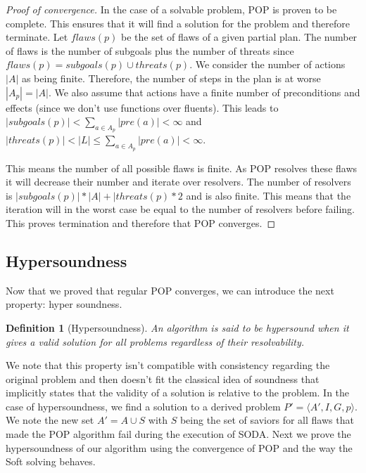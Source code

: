 \documentclass[]{article}
\newtheorem{definition}{Definition}
\begin{document}
\begin{proof}[Proof of convergence]

In the case of a solvable problem, POP is proven to be complete. This
ensures that it will find a solution for the problem and therefore
terminate. Let \(flaws(p)\) be the set of flaws of a given partial plan.
The number of flaws is the number of subgoals plus the number of threats
since \(flaws(p) = subgoals(p) \cup threats(p)\). We consider the number
of actions \(|A|\) as being finite. Therefore, the number of steps in
the plan is at worse \(|A_p| = |A|\). We also assume that actions have a
finite number of preconditions and effects (since we don't use functions
over fluents). This leads to
\(|subgoals(p)| < \sum_{a \in A_p} |pre(a)| < \infty\) and
\(|threats(p)| < |L| \le \sum_{a \in A_p} |pre(a)| < \infty\).

This means the number of all possible flaws is finite. As POP resolves
these flaws it will decrease their number and iterate over resolvers.
The number of resolvers is \(|subgoals(p)| * |A| + |threats(p) * 2\) and
is also finite. This means that the iteration will in the worst case be
equal to the number of resolvers before failing. This proves termination
and therefore that POP converges. \qedhere

\end{proof}

\subsection{Hypersoundness}\label{hypersoundeness}

Now that we proved that regular POP converges, we can introduce the next
property: hyper soundness.

\begin{definition}[Hypersoundness]

An algorithm is said to be hypersound when it gives a valid solution for
all problems regardless of their resolvability.

\end{definition}

We note that this property isn't compatible with consistency regarding
the original problem and then doesn't fit the classical idea of
soundness that implicitly states that the validity of a solution is
relative to the problem. In the case of hypersoundness, we find a
solution to a derived problem \(P' = \langle A', I, G, p\rangle\). We
note the new set \(A' = A \cup S\) with \(S\) being the set of saviors
for all flaws that made the POP algorithm fail during the execution of
SODA. Next we prove the hypersoundness of our algorithm using the
convergence of POP and the way the Soft solving behaves.
\end{document}
